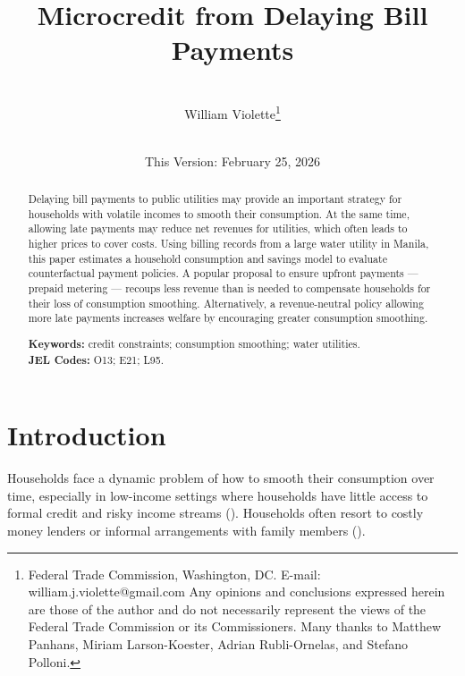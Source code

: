 \documentclass[12pt]{article}
\begin{document}
\begin{titlepage} 
\title{Microcredit from Delaying Bill Payments}
\author{\\[3em]
  William Violette\thanks{Federal Trade Commission, Washington, DC. E-mail: william.j.violette@gmail.com   Any opinions and conclusions expressed herein are those of the author and do not necessarily represent the views of the Federal Trade Commission or its Commissioners.  Many thanks to Matthew Panhans, Miriam Larson-Koester, Adrian Rubli-Ornelas, and Stefano Polloni.} \\
 \\ 
  }
\vspace{30mm}
\date{\vspace{5mm}This Version: February 25, 2026}
\maketitle
\begin{abstract}

Delaying bill payments to public utilities may provide an important strategy for households with volatile incomes to smooth their consumption.  At the same time, allowing late payments may reduce net revenues for utilities, which often leads to higher prices to cover costs.  Using billing records from a large water utility in Manila, this paper estimates a household consumption and savings model to evaluate counterfactual payment policies.  A popular proposal to ensure upfront payments --- prepaid metering --- recoups less revenue than is needed to compensate households for their loss of consumption smoothing.  Alternatively, a revenue-neutral policy allowing more late payments increases welfare by encouraging greater consumption smoothing.

\vspace{1in}
\textbf{Keywords:} credit constraints; consumption smoothing; water utilities. \\
\textbf{JEL Codes:} O13; E21; L95. \\
\bigskip
\end{abstract}
\setcounter{page}{0}
\thispagestyle{empty}
\end{titlepage}
\pagebreak \newpage

\onehalfspacing

\section{Introduction}

Households face a dynamic problem of how to smooth their consumption over time, especially in low-income settings where households have little access to formal credit and risky income streams (\cite{morduch1995income}).  Households often resort to costly money lenders or informal arrangements with family members (\cite{banerjee2007economic}).  
\end{document}
